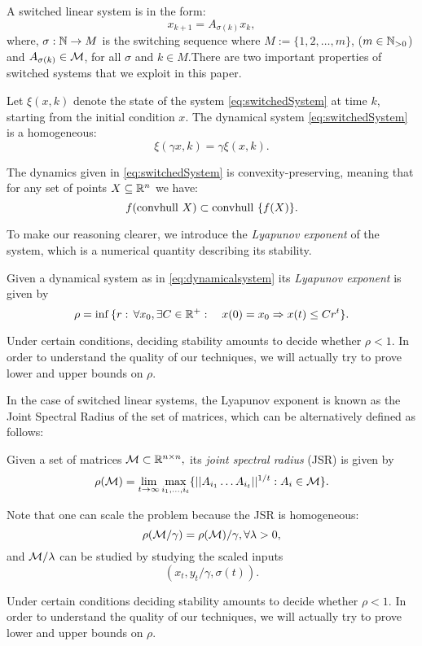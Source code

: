 A switched linear system is in the form:
\begin{equation}\label{eq:switchedSystem}x_{k+1} = A_{\sigma(k)}x_k,\end{equation}
where, $\sigma: \mathbb{N} \to M$ is the switching sequence where $M := \{1,2,\dots,m\}$, ($m \in \mathbb{N}_{>0}$) and $A_{\sigma(k)} \in \mathcal{M}$, for all $\sigma$ and $k \in M$.There are two important properties of switched systems that we exploit in this paper.
\begin{property}\label{property:homogeneity}
Let $\xi(x, k)$ denote the state of the system \eqref{eq:switchedSystem} at time $k$, starting from the initial condition $x$. The dynamical system \eqref{eq:switchedSystem} is a homogeneous:
$$\xi(\gamma x, k)= \gamma \xi(x, k). $$
\end{property}
\begin{property}\label{property:convpres}
The dynamics given in \eqref{eq:switchedSystem} is convexity-preserving, meaning that for any set of points $X \subseteq \mathbb{R}^n$ we have:
$$ f(\mbox{convhull }{X})\subset \mbox{convhull }\{f(X)\}. $$
\end{property}

To make our reasoning clearer, we introduce the \emph{Lyapunov exponent} of the system, which is a numerical quantity describing its stability.
\begin{definition}   Given a dynamical system as in \eqref{eq:dynamicalsystem} its \emph{Lyapunov exponent} is given by
$$\rho =\inf{\{r:\,\forall x_0, \exists C\in \mathbb{R}^+: \quad x(0)=x_0 \Rightarrow x(t)\leq Cr^t\}}. $$
\end{definition}
Under certain conditions, deciding stability amounts to decide whether $\rho<1.$  In order to understand the quality of our techniques, we will actually try to prove lower and upper bounds on $\rho.$ 

In the case of switched linear systems, the Lyapunov exponent is known as the Joint Spectral Radius of the set of matrices, which can be alternatively defined as follows:
\begin{definition} \cite{jungers_lncis} Given a set of matrices $\mathcal{M} \subset \mathbb{R}^{n\times n},$ its \emph{joint spectral radius} (JSR) is given by
$$\rho(\mathcal{M}) =\lim_{t\rightarrow \infty} \max_{i_1,\dots, i_t}\{||A_{i_1} \dots A_{i_t}||^{1/t}: A_i\in\mathcal{M}\}. $$
\end{definition}

\begin{remark}\label{rem:scaling}
 Note that one can scale the problem because the JSR is homogeneous:
$$\rho(\mathcal{M}/\gamma)=\rho(\mathcal{M})/\gamma, \forall \lambda>0, $$ and $\mathcal{M}/\lambda$ can be studied by studying the scaled inputs $$(x_t, y_t/\gamma,\sigma(t)).$$
\end{remark}

Under certain conditions deciding stability amounts to decide whether $\rho<1.$  In order to understand the quality of our techniques, we will actually try to prove lower and upper bounds on $\rho.$ 
